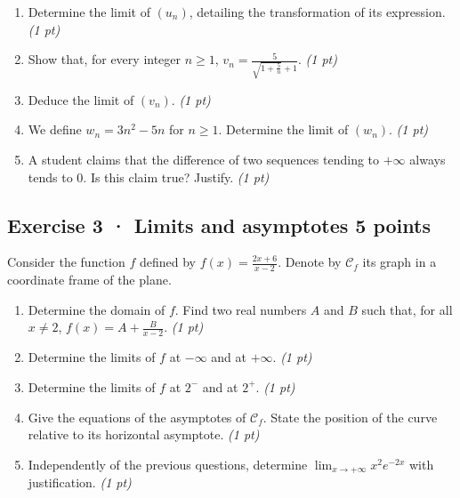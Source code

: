 \begin{enumerate}

\item Determine the limit of $(u_n)$, detailing the transformation of its expression. \hfill\textit{(1 pt)}

\item Show that, for every integer $n\ge1$, $v_n=\frac{5}{\sqrt{1+\frac{5}n}+1}$. \hfill\textit{(1 pt)}

\item Deduce the limit of $(v_n)$. \hfill\textit{(1 pt)}

\item We define $w_n=3n^2-5n$ for $n\ge1$. Determine the limit of $(w_n)$. \hfill\textit{(1 pt)}

\item A student claims that the difference of two sequences tending to $+\infty$ always tends to $0$. Is this claim true? Justify. \hfill\textit{(1 pt)}

\end{enumerate}

\clearpage{}\par

\subsection*{Exercise 3 · Limits and asymptotes \hfill 5 points}Consider the function $f$ defined by $f(x)=\frac{2x+6}{x-2}$. Denote by $\mathcal C_f$ its graph in a coordinate frame of the plane.

\begin{enumerate}

\item Determine the domain of $f$. Find two real numbers $A$ and $B$ such that, for all $x\ne2$, $f(x)=A+\frac B{x-2}$. \hfill\textit{(1 pt)}

\item Determine the limits of $f$ at $-\infty$ and at $+\infty$. \hfill\textit{(1 pt)}

\item Determine the limits of $f$ at $2^-$ and at $2^+$. \hfill\textit{(1 pt)}

\item Give the equations of the asymptotes of $\mathcal C_f$. State the position of the curve relative to its horizontal asymptote. \hfill\textit{(1 pt)}

\item Independently of the previous questions, determine $\displaystyle\lim_{x\to+\infty}x^{2}e^{-2x}$ with justification. \hfill\textit{(1 pt)}

\end{enumerate}

